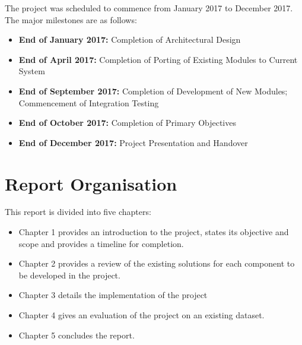 The project was scheduled to commence from January 2017 to December 2017. The major
milestones are as follows:

\begin{itemize}
    \item \textbf{End of January 2017:} Completion of Architectural Design
    \item \textbf{End of April 2017:} Completion of Porting of Existing Modules
    to Current System
    \item \textbf{End of September 2017:} Completion of Development of New Modules;
    Commencement of Integration Testing
    \item \textbf{End of October 2017:} Completion of Primary Objectives
    \item \textbf{End of December 2017:} Project Presentation and Handover
\end{itemize}

\section{Report Organisation}

This report is divided into five chapters:

\begin{itemize}
    \item Chapter 1 provides an introduction to the project, states its objective
    and scope and provides a timeline for completion.
    \item Chapter 2 provides a review of the existing solutions for each component
    to be developed in the project.
    \item Chapter 3 details the implementation of the project
    \item Chapter 4 gives an evaluation of the project on an existing dataset.
    \item Chapter 5 concludes the report.
\end{itemize}